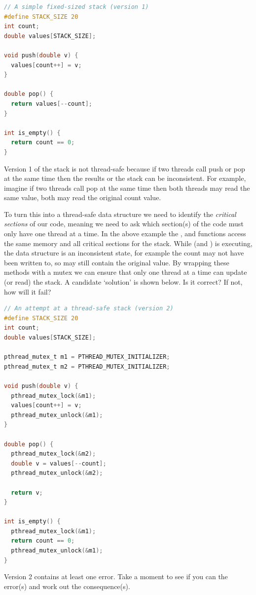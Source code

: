 \begin{lstlisting}[language=C]
// A simple fixed-sized stack (version 1)
#define STACK_SIZE 20
int count;
double values[STACK_SIZE];

void push(double v) {
  values[count++] = v;
}

double pop() {
  return values[--count];
}

int is_empty() {
  return count == 0;
}
\end{lstlisting}

Version 1 of the stack is not thread-safe because if two threads call push or pop at the same time then the results or the stack can be inconsistent.
For example, imagine if two threads call pop at the same time then both threads may read the same value, both may read the original count value.

To turn this into a thread-safe data structure we need to identify the \emph{critical sections} of our code, meaning we need to ask which section(s) of the code must only have one thread at a time.
In the above example the , and  functions access the same memory and all critical sections for the stack.
While  (and ) is executing, the data structure is an inconsistent state, for example the count may not have been written to, so may still contain the original value.
By wrapping these methods with a mutex we can ensure that only one thread at a time can update (or read) the stack.
A candidate `solution' is shown below.
Is it correct?
If not, how will it fail?

\begin{lstlisting}[language=C]
// An attempt at a thread-safe stack (version 2)
#define STACK_SIZE 20
int count;
double values[STACK_SIZE];

pthread_mutex_t m1 = PTHREAD_MUTEX_INITIALIZER;
pthread_mutex_t m2 = PTHREAD_MUTEX_INITIALIZER;

void push(double v) {
  pthread_mutex_lock(&m1);
  values[count++] = v;
  pthread_mutex_unlock(&m1);
}

double pop() {
  pthread_mutex_lock(&m2);
  double v = values[--count];
  pthread_mutex_unlock(&m2);

  return v;
}

int is_empty() {
  pthread_mutex_lock(&m1);
  return count == 0;
  pthread_mutex_unlock(&m1);
}
\end{lstlisting}

Version 2 contains at least one error.
Take a moment to see if you can the error(s) and work out the consequence(s).

